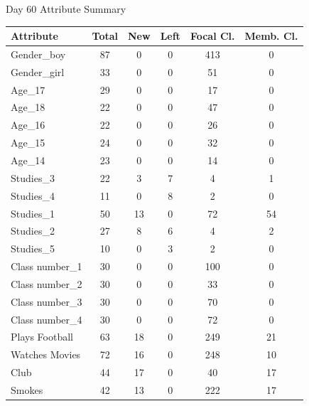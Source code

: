 \begin{question}
\begin{subquestion}
{		\begin{center}
			Day 60 Attribute Summary
						\begin{tabular}{lccccc}
				\hline
				Attribute          & Total & New & Left & Focal Cl. & Memb. Cl. \\ \hline
				Gender\_boy        & 87    & 0   & 0    & 413       & 0         \\
				Gender\_girl       & 33    & 0   & 0    & 51        & 0         \\
				Age\_17            & 29    & 0   & 0    & 17        & 0         \\
				Age\_18            & 22    & 0   & 0    & 47        & 0         \\
				Age\_16            & 22    & 0   & 0    & 26        & 0         \\
				Age\_15            & 24    & 0   & 0    & 32        & 0         \\
				Age\_14            & 23    & 0   & 0    & 14        & 0         \\
				Studies\_3         & 22    & 3   & 7    & 4         & 1         \\
				Studies\_4         & 11    & 0   & 8    & 2         & 0         \\
				Studies\_1         & 50    & 13  & 0    & 72        & 54        \\
				Studies\_2         & 27    & 8   & 6    & 4         & 2         \\
				Studies\_5         & 10    & 0   & 3    & 2         & 0         \\
				Class number\_1    & 30    & 0   & 0    & 100       & 0         \\
				Class number\_2    & 30    & 0   & 0    & 33        & 0         \\
				Class number\_3    & 30    & 0   & 0    & 70        & 0         \\
				Class number\_4    & 30    & 0   & 0    & 72        & 0         \\
				Plays Football     & 63    & 18  & 0    & 249       & 21        \\
				Watches Movies     & 72    & 16  & 0    & 248       & 10        \\
				Club               & 44    & 17  & 0    & 40        & 17        \\
				Smokes             & 42    & 13  & 0    & 222       & 17        \\ \hline
			\end{tabular}
		\end{center}
		
}
\end{subquestion}
\end{question}
